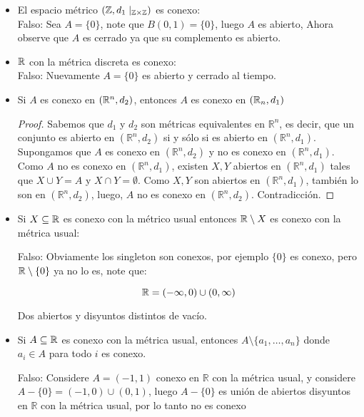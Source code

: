 \begin{itemize}[label={✎},leftmargin=*]

\item El espacio métrico $(\mathbb{Z},d_1\mid_{\mathbb{Z}\times \mathbb{Z}})$ es conexo:\\

Falso: Sea $A=\{0\}$, note que $B(0,1)=\{0\}$, luego $A$ es abierto, Ahora observe que $A$ es cerrado ya que su complemento es abierto.

\item $\mathbb{R}$ con la métrica discreta es conexo:\\

Falso: Nuevamente $A=\{0\}$ es abierto y cerrado al tiempo.

\item Si $A$ es conexo en $(\mathbb{R}^n,d_2)$, entonces $A$ es conexo en $(\mathbb{R}_n,d_1)$


\begin{proof}
 Sabemos que $d_1$ y $d_2$ son métricas equivalentes en $\mathbb{R}^n$, es decir, que un conjunto es abierto en $(\mathbb{R}^n,d_2)$ si y sólo si es abierto en $(\mathbb{R}^n,d_1)$. Supongamos que $A$ es conexo en $(\mathbb{R}^n,d_2)$ y no es conexo en $(\mathbb{R}^n,d_1)$. Como $A$ no es conexo en $(\mathbb{R}^n,d_1)$, existen $X,Y$ abiertos en $(\mathbb{R}^n,d_1)$ tales que $X \cup Y=A$ y $X \cap Y=\emptyset$. Como $X,Y$ son abiertos en $(\mathbb{R}^n,d_1)$, también lo son en $(\mathbb{R}^n,d_2)$, luego, $A$ no es conexo en $(\mathbb{R}^n,d_2)$. Contradicción.
\end{proof}



\item Si $X\subseteq \mathbb{R}$ es conexo con la métrico usual entonces $\mathbb{R}\setminus X$ es conexo con la métrica usual:

Falso: Obviamente los singleton son conexos, por ejemplo $\{0\}$ es conexo, pero $\mathbb{R}\setminus\{0\}$ ya no lo es, note que:

$$\mathbb{R}=(-\infty,0)\cup (0,\infty)$$

Dos abiertos y disyuntos distintos de vacío.

\item Si $A\subseteq \mathbb{R}$ es conexo con la métrica usual, entonces $A\setminus \{a_1,\ldots,a_n\}$ donde $a_i\in A$ para todo $i$ es conexo.

Falso: Considere $A=(-1,1)$ conexo en $\mathbb{R}$ con la métrica usual, y considere $A-\{0\}=(-1,0)\cup (0,1)$, luego $A-\{0\}$ es unión de abiertos disyuntos en $\mathbb{R}$ con la métrica usual, por lo tanto no es conexo


\end{itemize}

